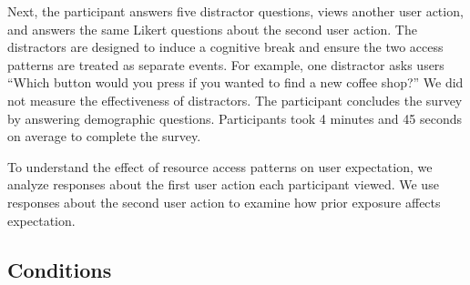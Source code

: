 
Next, the participant answers five distractor questions, views another user action,
 and answers the same Likert questions about the second
user action. The distractors are designed to induce a cognitive break
and ensure the two access patterns are treated as separate events. 
For example, one distractor asks users ``Which button would you press if 
you wanted to find a new coffee shop?''
We did not measure the effectiveness of distractors.
The
participant concludes the survey by answering demographic questions.
Participants took 4 minutes and 45 seconds on average to complete the survey.


To understand the effect of resource access patterns on user
expectation, we analyze responses about the first user action each
participant viewed. We use responses about the second user action to
examine how prior exposure affects expectation.



\subsection{Conditions}


